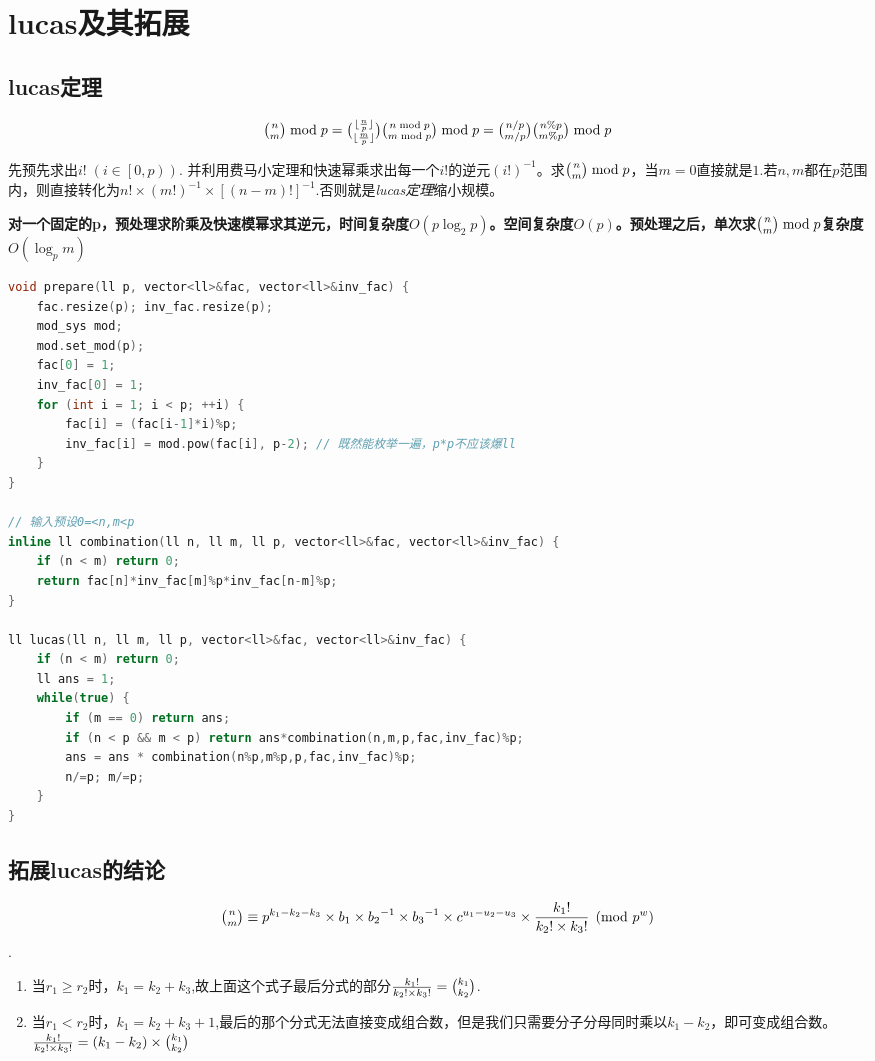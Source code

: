 \section{lucas及其拓展}
\subsection{lucas定理}
	\par $$\tbinom{n}{m} \bmod p = \tbinom{\lfloor \frac{n}{p} \rfloor}{\lfloor \frac{m}{p} \rfloor} \tbinom{n \bmod p}{m \bmod p} \bmod p=\tbinom{n/p}{m/p}\tbinom{n\%p}{m\%p} \bmod p$$  
	\par 先预先求出$i! \;(i \in \left[0,p\right))$. 并利用费马小定理和快速幂乘求出每一个$i!$的逆元$(i!)^{-1}$。求$\tbinom{n}{m} \bmod p$，当$m=0$直接就是$1$.若$n,m$都在$p$范围内，则直接转化为$n! \times (m!)^{-1} \times [(n-m)!]^{-1}$.否则就是\textit{lucas定理}缩小规模。
	\par {\bfseries 对一个固定的p，预处理求阶乘及快速模幂求其逆元，时间复杂度$O(p\log_2{p})$。空间复杂度$O(p)$。预处理之后，单次求$\tbinom{n}{m} \bmod p$复杂度$O(\log_{p}{m})$} 
	\begin{lstlisting}[language={c++}]
void prepare(ll p, vector<ll>&fac, vector<ll>&inv_fac) {
	fac.resize(p); inv_fac.resize(p);
	mod_sys mod;
	mod.set_mod(p);
	fac[0] = 1;
	inv_fac[0] = 1;
	for (int i = 1; i < p; ++i) {
		fac[i] = (fac[i-1]*i)%p;
		inv_fac[i] = mod.pow(fac[i], p-2); // 既然能枚举一遍，p*p不应该爆ll
	}
}

// 输入预设0=<n,m<p
inline ll combination(ll n, ll m, ll p, vector<ll>&fac, vector<ll>&inv_fac) {
	if (n < m) return 0;
	return fac[n]*inv_fac[m]%p*inv_fac[n-m]%p;
}

ll lucas(ll n, ll m, ll p, vector<ll>&fac, vector<ll>&inv_fac) {
	if (n < m) return 0;
	ll ans = 1;
	while(true) {
		if (m == 0) return ans;
		if (n < p && m < p) return ans*combination(n,m,p,fac,inv_fac)%p;
		ans = ans * combination(n%p,m%p,p,fac,inv_fac)%p;
		n/=p; m/=p;
	}
}
	\end{lstlisting}

\subsection{拓展lucas的结论}
\par $$\tbinom{n}{m} \equiv
{
	p^{k_1-k_2-k_3} \times b_1 \times {b_2}^{-1} \times {b_3}^{-1} 
	\times c^{u_1-u_2-u_3} 
	\times \frac{{k_1}!}{{k_2}! \times {k_3}!}
} \pmod{p^w}$$.
\begin{enumerate}
	\item 当$r_1 \geq r_2$时，$k_1=k_2+k_3$,故上面这个式子最后分式的部分$\frac{{k_1}!}{{k_2}! \times {k_3}!}=\tbinom{k_1}{k_2}$.
	\item 当$r_1 < r_2$时，$k_1=k_2+k_3+1$,最后的那个分式无法直接变成组合数，但是我们只需要分子分母同时乘以$k_1-k_2$，即可变成组合数。$\frac{{k_1}!}{{k_2}! \times {k_3}!}=(k_1-k_2) \times \tbinom{k_1}{k_2}$
\end{enumerate}

